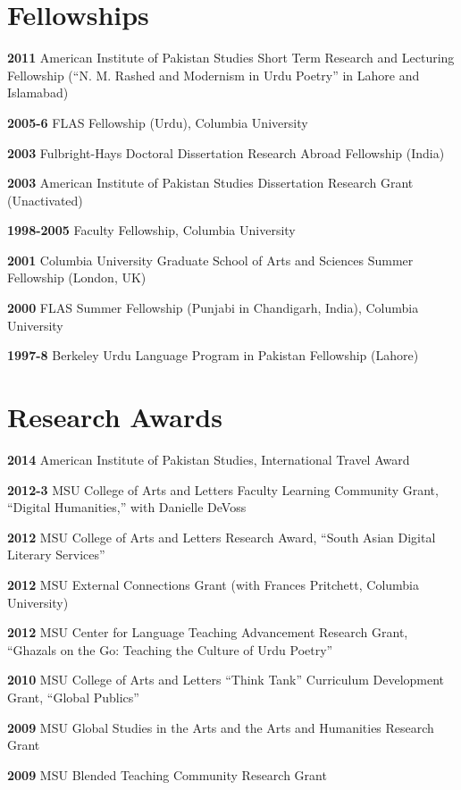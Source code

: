 \documentclass[letterpaper,12pt]{article}
\begin{document}
\section{Fellowships%
  \label{fellowships}%
}

\textbf{2011}
American Institute of Pakistan Studies
Short Term Research and Lecturing Fellowship
(“N. M. Rashed and Modernism in Urdu Poetry” in Lahore and Islamabad)

\textbf{2005-6}
FLAS Fellowship (Urdu), Columbia University

\textbf{2003}
Fulbright-Hays Doctoral Dissertation Research Abroad Fellowship (India)

\textbf{2003}
American Institute of Pakistan Studies Dissertation Research Grant (Unactivated)

\textbf{1998-2005}
Faculty Fellowship, Columbia University

\textbf{2001}
Columbia University Graduate School of Arts and Sciences Summer Fellowship (London, UK)

\textbf{2000}
FLAS Summer Fellowship (Punjabi in Chandigarh, India), Columbia University

\textbf{1997-8}
Berkeley Urdu Language Program in Pakistan Fellowship (Lahore)


\section{Research Awards%
  \label{research-awards}%
}

\textbf{2014}
American Institute of Pakistan Studies, International Travel Award

\textbf{2012-3}
MSU College of Arts and Letters Faculty Learning Community Grant,
“Digital Humanities,” with Danielle DeVoss

\textbf{2012}
MSU College of Arts and Letters Research Award,
“South Asian Digital Literary Services”

\textbf{2012}
MSU External Connections Grant (with Frances Pritchett, Columbia University)

\textbf{2012}
MSU Center for Language Teaching Advancement Research Grant,
“Ghazals on the Go: Teaching the Culture of Urdu Poetry”

\textbf{2010}
MSU College of Arts and Letters “Think Tank” Curriculum Development Grant,
“Global Publics”

\textbf{2009} MSU Global Studies in the Arts and the Arts and Humanities Research Grant

\textbf{2009} MSU Blended Teaching Community Research Grant
\end{document}
